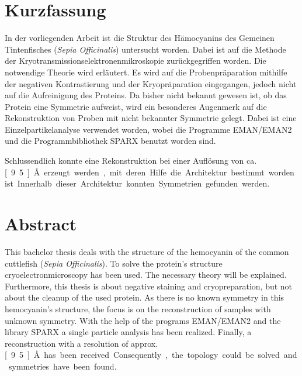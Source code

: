 \section*{Kurzfassung}
In der vorliegenden Arbeit ist die Struktur des Hämocyanins des Gemeinen Tintenfisches (\textit{Sepia Officinalis}) untersucht worden.
Dabei ist auf die Methode der Kryotransmissionselektronenmikroskopie zurückgegriffen worden.
Die notwendige Theorie wird erläutert.
Es wird auf die Probenpräparation mithilfe der negativen Kontrastierung und der Kryopräparation eingegangen, jedoch nicht auf die Aufreinigung des Proteins.
Da bisher nicht bekannt gewesen ist, ob das Protein eine Symmetrie aufweist, wird ein besonderes Augenmerk auf die Rekonstruktion von Proben mit nicht bekannter Symmetrie gelegt.
Dabei ist eine Einzelpartikelanalyse verwendet worden, wobei die Programme EMAN/EMAN2 und die Programmbibliothek SPARX benutzt worden sind.

Schlussendlich konnte eine Rekonstruktion bei einer Auflösung von ca. \unit[9.5]{\AA} erzeugt werden, mit deren Hilfe die Architektur bestimmt worden ist.
Innerhalb dieser Architektur konnten Symmetrien gefunden werden.

\section*{Abstract}
This bachelor thesis deals with the structure of the hemocyanin of the common cuttlefish (\textit{Sepia Officinalis}).
To solve the protein's structure cryoelectronmicroscopy has been used.
The necessary theory will be explained.
Furthermore, this thesis is about negative staining and cryopreparation, but not about the cleanup of the used protein.
As there is no known symmetry in this hemocyanin's structure, the focus is on the reconstruction of samples with unknown symmetry.
With the help of the programs EMAN/EMAN2 and the library SPARX a single particle analysis has been realized. 
Finally, a reconstruction with a resolution of approx. \unit[9.5]{\AA} has been received.
Consequently, the topology could be solved and symmetries have been found.